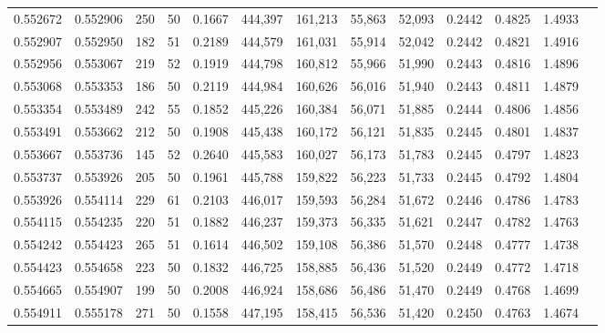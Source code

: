 \begin{tabular}{rrrrrrrrrrrrr}
0.552672 & 0.552906 &   250 &  50 &                                     0.1667 & 444,397 & 161,213 &  55,863 &  52,093 & 0.2442 & 0.4825 & 1.4933 \\
0.552907 & 0.552950 &   182 &  51 &                                     0.2189 & 444,579 & 161,031 &  55,914 &  52,042 & 0.2442 & 0.4821 & 1.4916 \\
0.552956 & 0.553067 &   219 &  52 &                                     0.1919 & 444,798 & 160,812 &  55,966 &  51,990 & 0.2443 & 0.4816 & 1.4896 \\
0.553068 & 0.553353 &   186 &  50 &                                     0.2119 & 444,984 & 160,626 &  56,016 &  51,940 & 0.2443 & 0.4811 & 1.4879 \\
0.553354 & 0.553489 &   242 &  55 &                                     0.1852 & 445,226 & 160,384 &  56,071 &  51,885 & 0.2444 & 0.4806 & 1.4856 \\
0.553491 & 0.553662 &   212 &  50 &                                     0.1908 & 445,438 & 160,172 &  56,121 &  51,835 & 0.2445 & 0.4801 & 1.4837 \\
0.553667 & 0.553736 &   145 &  52 &                                     0.2640 & 445,583 & 160,027 &  56,173 &  51,783 & 0.2445 & 0.4797 & 1.4823 \\
0.553737 & 0.553926 &   205 &  50 &                                     0.1961 & 445,788 & 159,822 &  56,223 &  51,733 & 0.2445 & 0.4792 & 1.4804 \\
0.553926 & 0.554114 &   229 &  61 &                                     0.2103 & 446,017 & 159,593 &  56,284 &  51,672 & 0.2446 & 0.4786 & 1.4783 \\
0.554115 & 0.554235 &   220 &  51 &                                     0.1882 & 446,237 & 159,373 &  56,335 &  51,621 & 0.2447 & 0.4782 & 1.4763 \\
0.554242 & 0.554423 &   265 &  51 &                                     0.1614 & 446,502 & 159,108 &  56,386 &  51,570 & 0.2448 & 0.4777 & 1.4738 \\
0.554423 & 0.554658 &   223 &  50 &                                     0.1832 & 446,725 & 158,885 &  56,436 &  51,520 & 0.2449 & 0.4772 & 1.4718 \\
0.554665 & 0.554907 &   199 &  50 &                                     0.2008 & 446,924 & 158,686 &  56,486 &  51,470 & 0.2449 & 0.4768 & 1.4699 \\
0.554911 & 0.555178 &   271 &  50 &                                     0.1558 & 447,195 & 158,415 &  56,536 &  51,420 & 0.2450 & 0.4763 & 1.4674 \\

\end{tabular}
